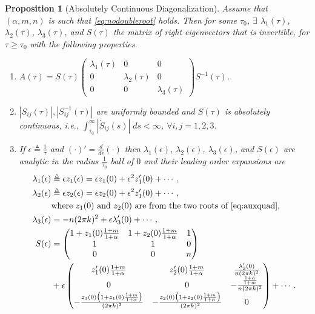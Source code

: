 \documentclass[a4paper,11pt]{article}
\newtheorem{proposition}{Proposition}[section]
\theoremstyle{remark}
\begin{document}
\begin{proposition}[Absolutely Continuous Diagonalization] \label{prop:ctsdiag}
 Assume that $(\alpha,m,n)$ is such that \eqref{eq:nodoubleroot} holds. Then for some $\tau_0$, $\exists$ $\lambda_1(\tau)$, $\lambda_2(\tau)$, $\lambda_3(\tau)$, and $S(\tau)$ the matrix of right eigenvectors that is invertible, for $\tau\ge\tau_0$  with the following properties.
 \begin{enumerate}
  \item $A(\tau) = S(\tau) \begin{pmatrix} \lambda_1(\tau) & 0 & 0\\ 0 & \lambda_2(\tau) & 0 \\ 0 & 0 & \lambda_3(\tau) \end{pmatrix} S^{-1}(\tau)$.%
  \item $|S_{ij}(\tau)|, |S^{-1}_{ij}(\tau)|$ are uniformly bounded and $S(\tau)$ is absolutely continuous, i.e., $\int_{\tau_0}^\infty |\dot{S}_{ij}(s)|\; ds <\infty$, $\forall i,j=1,2,3$.
  \item If $\epsilon\triangleq \frac{1}{\tau}$ and $(\cdot)'=\frac{d}{d\epsilon}(\cdot)$ then $\lambda_1(\epsilon)$, $\lambda_2(\epsilon)$, $\lambda_3(\epsilon)$, and $S(\epsilon)$ are analytic in the radius $\frac{1}{\tau_0}$ ball of $0$ and their leading order expansions are
  \begin{align}
   \lambda_1(\epsilon) &\triangleq \epsilon z_1(\epsilon) = \epsilon z_1(0) + \epsilon^2 z_1'(0) + \cdots,\nonumber\\
   \lambda_2(\epsilon) &\triangleq \epsilon z_2(\epsilon) =\epsilon z_2(0) + \epsilon^2 z_1'(0) + \cdots,\nonumber\\ &\text{where $z_1(0)$ and $z_2(0)$ are from the two roots of \eqref{eq:auxquad},}\nonumber \\
   \lambda_3(\epsilon) &= -n(2\pi k)^2 + \epsilon\lambda_3'(0) + \cdots,\\
   S(\epsilon) &=
   \begin{pmatrix}
    1 + z_1(0)\frac{1+m}{1+\alpha} & 1 + z_2(0)\frac{1+m}{1+\alpha} & 1\\
    1 & 1 & 0\\
    0 & 0 & n\\
   \end{pmatrix} \\&+ \epsilon
   \begin{pmatrix}
    z_1'(0)\frac{1+m}{1+\alpha} & z_2'(0)\frac{1+m}{1+\alpha} & \frac{\lambda_3'(0)}{n(2\pi k)^2}\\
    0 & 0 & -\frac{\frac{1+\alpha}{1+m}}{n(2\pi k)^2}\\
    -\frac{z_1(0)\big(1+z_1(0)\frac{1+m}{1+\alpha}\big)}{(2\pi k)^2} & -\frac{z_2(0)\big(1+z_2(0)\frac{1+m}{1+\alpha}\big)}{(2\pi k)^2} & 0\\
   \end{pmatrix} + \cdots. \label{eq:S}
  \end{align}
 \end{enumerate}
\end{proposition}
\end{document}
